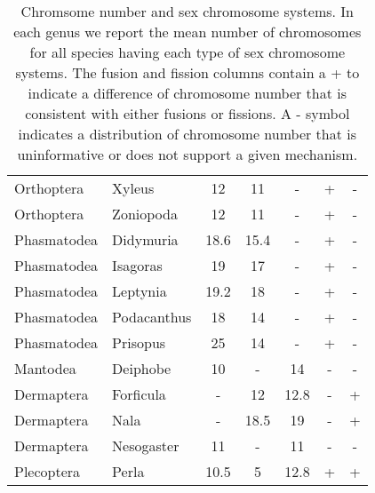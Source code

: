 \begin{table}
\begin{tabular}{llccccc}
Orthoptera             & Xyleus                 & 12                          & 11                          & -                            & +                 & -                 \\
Orthoptera             & Zoniopoda              & 12                          & 11                          & -                            & +                 & -                 \\
Phasmatodea            & Didymuria              & 18.6                        & 15.4                        & -                            & +                 & -                 \\
Phasmatodea            & Isagoras               & 19                          & 17                          & -                            & +                 & -                 \\
Phasmatodea            & Leptynia               & 19.2                        & 18                          & -                            & +                 & -                 \\
Phasmatodea            & Podacanthus            & 18                          & 14                          & -                            & +                 & -                 \\
Phasmatodea            & Prisopus               & 25                          & 14                          & -                            & +                 & -                 \\
Mantodea               & Deiphobe               & 10                          & -                           & 14                           & -                 & -                 \\
Dermaptera             & Forficula              & -                           & 12                          & 12.8                         & -                 & +                 \\
Dermaptera             & Nala                   & -                           & 18.5                        & 19                           & -                 & +                 \\
Dermaptera             & Nesogaster             & 11                          & -                           & 11                           & -                 & -                 \\
Plecoptera             & Perla                  & 10.5                        & 5                           & 12.8                         & +                 & +                 \\ \hline
\end{tabular}
\caption{Chromsome number and sex chromosome systems. In each genus we report the mean number of chromosomes for all species having each type of sex chromosome systems. The fusion and fission columns contain a + to indicate a difference of chromosome number that is consistent with either fusions or fissions. A - symbol indicates a distribution of chromosome number that is uninformative or does not support a given mechanism.}
\label{tab:fusions}
\end{table}

